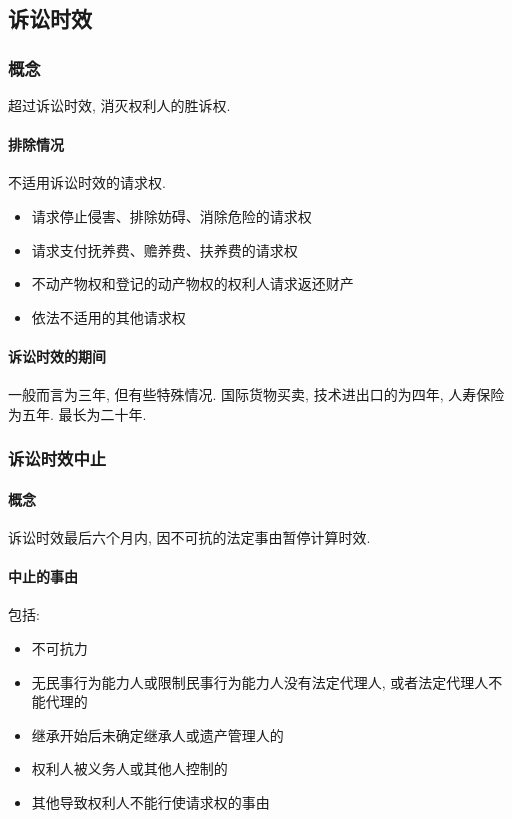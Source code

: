 \subsection{诉讼时效}

\subsubsection{概念} 超过诉讼时效, 消灭权利人的胜诉权.

\paragraph{排除情况} 不适用诉讼时效的请求权.

\begin{itemize}
    \item 请求停止侵害、排除妨碍、消除危险的请求权
    \item 请求支付抚养费、赡养费、扶养费的请求权
    \item 不动产物权和登记的动产物权的权利人请求返还财产
    \item 依法不适用的其他请求权
\end{itemize}

\paragraph{诉讼时效的期间} 一般而言为三年, 但有些特殊情况. 国际货物买卖, 技术进出口的为四年, 人寿保险为五年. 最长为二十年.

\subsubsection{诉讼时效中止}

\paragraph{概念} 诉讼时效最后六个月内, 因不可抗的法定事由暂停计算时效.

\paragraph{中止的事由} 包括:

\begin{itemize}
    \item 不可抗力
    \item 无民事行为能力人或限制民事行为能力人没有法定代理人, 或者法定代理人不能代理的
    \item 继承开始后未确定继承人或遗产管理人的
    \item 权利人被义务人或其他人控制的
    \item 其他导致权利人不能行使请求权的事由
\end{itemize}

